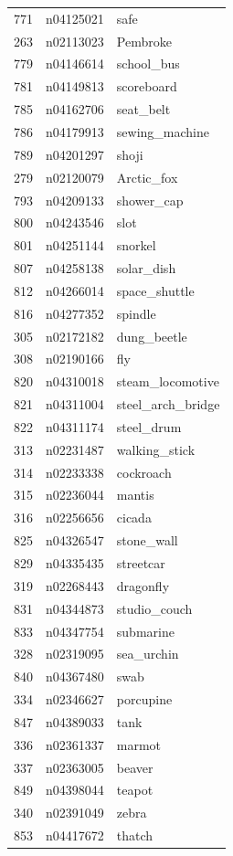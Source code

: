 \begin{table}
\begin{tabular}{cll}
771 & n04125021 & safe \\
263 & n02113023 & Pembroke \\
779 & n04146614 & school_bus \\
781 & n04149813 & scoreboard \\
785 & n04162706 & seat_belt \\
786 & n04179913 & sewing_machine \\
789 & n04201297 & shoji \\
279 & n02120079 & Arctic_fox \\
793 & n04209133 & shower_cap \\
800 & n04243546 & slot \\
801 & n04251144 & snorkel \\
807 & n04258138 & solar_dish \\
812 & n04266014 & space_shuttle \\
816 & n04277352 & spindle \\
305 & n02172182 & dung_beetle \\
308 & n02190166 & fly \\
820 & n04310018 & steam_locomotive \\
821 & n04311004 & steel_arch_bridge \\
822 & n04311174 & steel_drum \\
313 & n02231487 & walking_stick \\
314 & n02233338 & cockroach \\
315 & n02236044 & mantis \\
316 & n02256656 & cicada \\
825 & n04326547 & stone_wall \\
829 & n04335435 & streetcar \\
319 & n02268443 & dragonfly \\
831 & n04344873 & studio_couch \\
833 & n04347754 & submarine \\
328 & n02319095 & sea_urchin \\
840 & n04367480 & swab \\
334 & n02346627 & porcupine \\
847 & n04389033 & tank \\
336 & n02361337 & marmot \\
337 & n02363005 & beaver \\
849 & n04398044 & teapot \\
340 & n02391049 & zebra \\
853 & n04417672 & thatch \\

\end{tabular}
\end{table}
